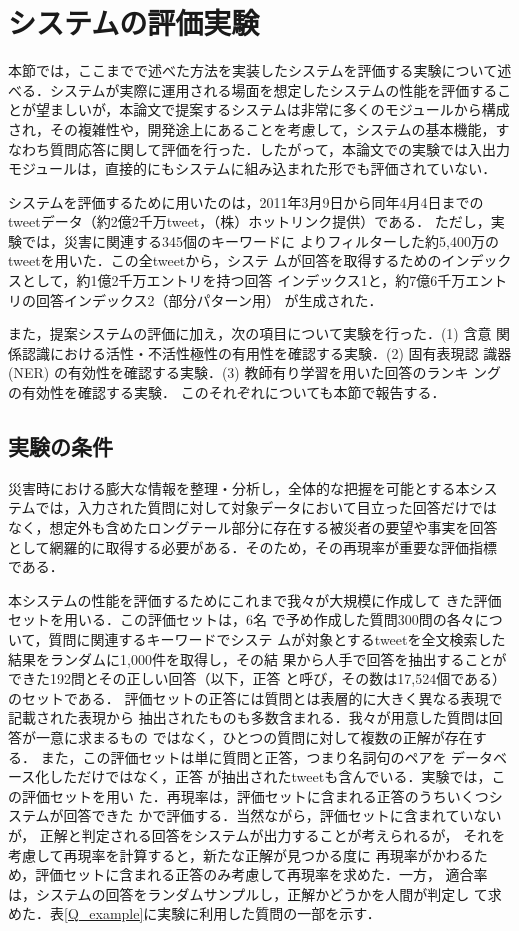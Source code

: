 \documentclass[japanese]{jnlp_1.4}
\begin{document}
\section{システムの評価実験}
\label{Experiments}

本節では，ここまでで述べた方法を実装したシステムを評価する実験について述
べる．システムが実際に運用される場面を想定したシステムの性能を評価するこ
とが望ましいが，本論文で提案するシステムは非常に多くのモジュールから構成
され，その複雑性や，開発途上にあることを考慮して，システムの基本機能，す
なわち質問応答に関して評価を行った．したがって，本論文での実験では入出力
モジュールは，直接的にもシステムに組み込まれた形でも評価されていない．

システムを評価するために用いたのは，2011年3月9日から同年4月4日までの
tweetデータ（約2億2千万tweet，（株）ホットリンク提供）である．
ただし，実験では，災害に関連する345個のキーワードに
よりフィルターした約5,400万のtweetを用いた．この全tweetから，システ
ムが回答を取得するためのインデックスとして，約1億2千万エントリを持つ回答
インデックス1と，約7億6千万エントリの回答インデックス2（部分パターン用）
が生成された．

また，提案システムの評価に加え，次の項目について実験を行った．(1) 含意
関係認識における活性・不活性極性の有用性を確認する実験．(2) 固有表現認
識器 (NER) の有効性を確認する実験．(3) 教師有り学習を用いた回答のランキ
ングの有効性を確認する実験． このそれぞれについても本節で報告する．


\subsection{実験の条件}

災害時における膨大な情報を整理・分析し，全体的な把握を可能とする本シス
テムでは，入力された質問に対して対象データにおいて目立った回答だけでは
なく，想定外も含めたロングテール部分に存在する被災者の要望や事実を回答
として網羅的に取得する必要がある．そのため，その再現率が重要な評価指標
である．

本システムの性能を評価するためにこれまで我々が大規模に作成して
きた評価セットを用いる\cite{Kawada2013}．この評価セットは，6名
で予め作成した質問300問の各々について，質問に関連するキーワードでシステ
ムが対象とするtweetを全文検索した結果をランダムに1,000件を取得し，その結
果から人手で回答を抽出することができた192問とその正しい回答（以下，正答
と呼び，その数は17,524個である）のセットである．
評価セットの正答には質問とは表層的に大きく異なる表現で記載された表現から
抽出されたものも多数含まれる．我々が用意した質問は回答が一意に求まるもの
ではなく，ひとつの質問に対して複数の正解が存在する．
また，この評価セットは単に質問と正答，つまり名詞句のペアを
データベース化しただけではなく，正答
が抽出されたtweetも含んでいる．実験では，この評価セットを用い
た．再現率は，評価セットに含まれる正答のうちいくつシステムが回答できた
かで評価する．当然ながら，評価セットに含まれていないが，
正解と判定される回答をシステムが出力することが考えられるが，
それを考慮して再現率を計算すると，新たな正解が見つかる度に
再現率がかわるため，評価セットに含まれる正答のみ考慮して再現率を求めた．一方，
適合率は，システムの回答をランダムサンプルし，正解かどうかを人間が判定し
て求めた．表\ref{Q_example}に実験に利用した質問の一部を示す．
 
\end{document}
